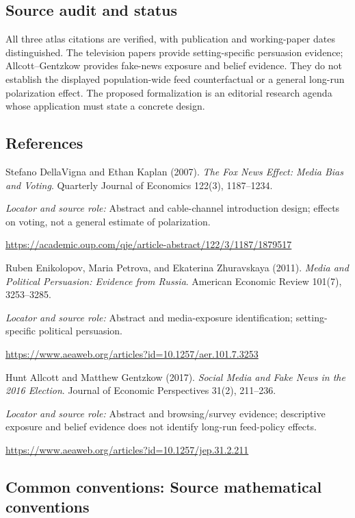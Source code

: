 \documentclass[11pt,a4paper]{article}
\begin{document}
\subsection*{Source audit and status}
All three atlas citations are verified, with publication and working-paper dates distinguished. The television papers provide setting-specific persuasion evidence; Allcott--Gentzkow provides fake-news exposure and belief evidence. They do not establish the displayed population-wide feed counterfactual or a general long-run polarization effect. The proposed formalization is an editorial research agenda whose application must state a concrete design.
\subsection*{References}
{\footnotesize\raggedright
\begin{enumerate}[label={\textbf{[S\arabic*]}},leftmargin=3em]
\item Stefano DellaVigna and Ethan Kaplan (2007). \emph{The Fox News Effect: Media Bias and Voting}. Quarterly Journal of Economics 122(3), 1187--1234.\par
\textit{Locator and source role:} Abstract and cable-channel introduction design; effects on voting, not a general estimate of polarization.\par
\url{https://academic.oup.com/qje/article-abstract/122/3/1187/1879517}
\item Ruben Enikolopov, Maria Petrova, and Ekaterina Zhuravskaya (2011). \emph{Media and Political Persuasion: Evidence from Russia}. American Economic Review 101(7), 3253--3285.\par
\textit{Locator and source role:} Abstract and media-exposure identification; setting-specific political persuasion.\par
\url{https://www.aeaweb.org/articles?id=10.1257/aer.101.7.3253}
\item Hunt Allcott and Matthew Gentzkow (2017). \emph{Social Media and Fake News in the 2016 Election}. Journal of Economic Perspectives 31(2), 211--236.\par
\textit{Locator and source role:} Abstract and browsing/survey evidence; descriptive exposure and belief evidence does not identify long-run feed-policy effects.\par
\url{https://www.aeaweb.org/articles?id=10.1257/jep.31.2.211}
\end{enumerate}
}

\subsection*{Common conventions: Source mathematical conventions}
\end{document}
